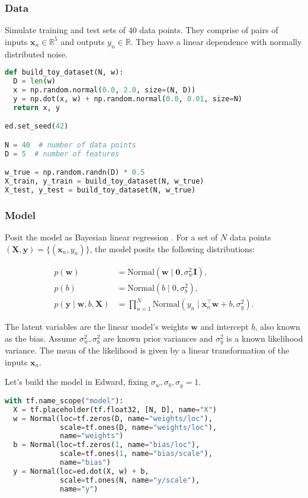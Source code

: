 \subsubsection{Data}

Simulate training and test sets of $40$ data points. They comprise of
pairs of inputs $\mathbf{x}_n\in\mathbb{R}^{5}$ and outputs
$y_n\in\mathbb{R}$. They have a linear dependence with normally
distributed noise.

\begin{lstlisting}[language=Python]
def build_toy_dataset(N, w):
  D = len(w)
  x = np.random.normal(0.0, 2.0, size=(N, D))
  y = np.dot(x, w) + np.random.normal(0.0, 0.01, size=N)
  return x, y

ed.set_seed(42)

N = 40  # number of data points
D = 5  # number of features

w_true = np.random.randn(D) * 0.5
X_train, y_train = build_toy_dataset(N, w_true)
X_test, y_test = build_toy_dataset(N, w_true)
\end{lstlisting}

\subsubsection{Model}

Posit the model as Bayesian linear regression \citep{murphy2012machine}.
For a set of $N$ data points $(\mathbf{X},\mathbf{y})=\{(\mathbf{x}_n, y_n)\}$,
the model posits the following distributions:

\begin{align*}
  p(\mathbf{w})
  &=
  \text{Normal}(\mathbf{w} \mid \mathbf{0}, \sigma_w^2\mathbf{I}),
  \\[1.5ex]
  p(b)
  &=
  \text{Normal}(b \mid 0, \sigma_b^2),
  \\
  p(\mathbf{y} \mid \mathbf{w}, b, \mathbf{X})
  &=
  \prod_{n=1}^N
  \text{Normal}(y_n \mid \mathbf{x}_n^\top\mathbf{w} + b, \sigma_y^2).
\end{align*}

The latent variables are the linear model's weights $\mathbf{w}$ and
intercept $b$, also known as the bias.
Assume $\sigma_w^2,\sigma_b^2$ are known prior variances and $\sigma_y^2$ is a
known likelihood variance. The mean of the likelihood is given by a
linear transformation of the inputs $\mathbf{x}_n$.

Let's build the model in Edward, fixing $\sigma_w,\sigma_b,\sigma_y=1$.

\begin{lstlisting}[language=Python]
with tf.name_scope("model"):
  X = tf.placeholder(tf.float32, [N, D], name="X")
  w = Normal(loc=tf.zeros(D, name="weights/loc"),
             scale=tf.ones(D, name="weights/loc"),
             name="weights")
  b = Normal(loc=tf.zeros(1, name="bias/loc"),
             scale=tf.ones(1, name="bias/scale"),
             name="bias")
  y = Normal(loc=ed.dot(X, w) + b,
             scale=tf.ones(N, name="y/scale"),
             name="y")
\end{lstlisting}

